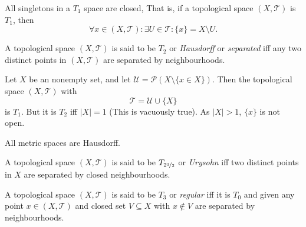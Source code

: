 \begin{proposition}
	\label{prop: all singletons in a T_1 space are closed}
	
	All singletons in a $T_1$ space are closed, That is, if a topological space $(X, \mathcal T)$ is $T_1$, then
	$$
	\forall x \in (X, \mathcal T) : \exists U \in \mathcal T : \{x\} = X \setminus U.
	$$
\end{proposition}


\begin{definition}
	[$T_2$ spaces]
	\label{def: T_2 spaces}
	A topological space $(X, \mathcal T)$ is said to be $T_2$ or \textit{Hausdorff} or \textit{separated} iff any two distinct points in $(X, \mathcal T)$ are separated by neighbourhoods.
\end{definition}

\begin{example}
	\label{eg: T_2 but not T_1}
	Let $X$ be an nonempty set, and let $\mathcal U = \mathcal P(X \setminus \{x \in X\})$. Then the topological space $(X, \mathcal T)$ with
		$$
		\mathcal T = \mathcal U \cup \{X\}
		$$
		is $T_1$. But it is $T_2$ iff $|X| = 1$ (This is vacuously true). As $|X| > 1$, $\{x\}$ is not open.
\end{example}

\begin{proposition}
	All metric spaces are Hausdorff.
\end{proposition}


\begin{definition}
	\label{def: T_2.5 spaces}
	A topological space $(X, \mathcal T)$ is said to be $T_{2 \nicefrac{1}{2}}$ or \textit{Urysohn} iff two distinct points in $X$ are separated by closed neighbourhoods.
\end{definition}


\begin{definition}
	[$T_3$ spaces]
	\label{def: T_3 spaces}
	A topological space $(X, \mathcal T)$ is said to be $T_3$ or \textit{regular} iff it is $T_0$ and given any point $x \in (X, \mathcal T)$ and closed set $V \subseteq X$ with $x \notin V$ are separated by neighbourhoods.
\end{definition}


